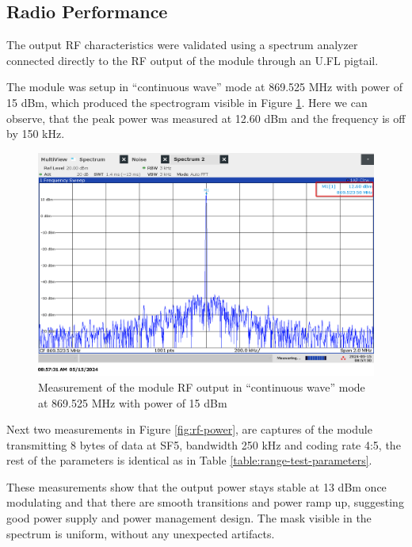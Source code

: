 \subsection{Radio Performance}
The output RF characteristics were validated using a spectrum analyzer connected directly to the RF output of the module through an U.FL pigtail.

The module was setup in ``continuous wave'' mode \cite{semtech_corporation_sx12612_2024} at 869.525 MHz with power of 15 dBm, which produced the spectrogram visible in Figure \ref{fig:rf-mask-wave}. Here we can observe, that the peak power was measured at 12.60 dBm and the frequency is off by 150 kHz.

\begin{figure}
    \includegraphics[width=.9\textwidth]{fig/rf-mask-wave.png}
    \caption{\label{fig:rf-mask-wave}Measurement of the module RF output in ``continuous wave'' mode at 869.525 MHz with power of 15 dBm}
\end{figure}

Next two measurements in Figure \ref{fig:rf-power}, are captures of the module transmitting 8 bytes of data at SF5, bandwidth 250 kHz and coding rate 4:5, the rest of the parameters is identical as in Table \ref{table:range-test-parameters}. 

These measurements show that the output power stays stable at 13 dBm once modulating and that there are smooth transitions and power ramp up, suggesting good power supply and power management design. The mask visible in the spectrum is uniform, without any unexpected artifacts.

